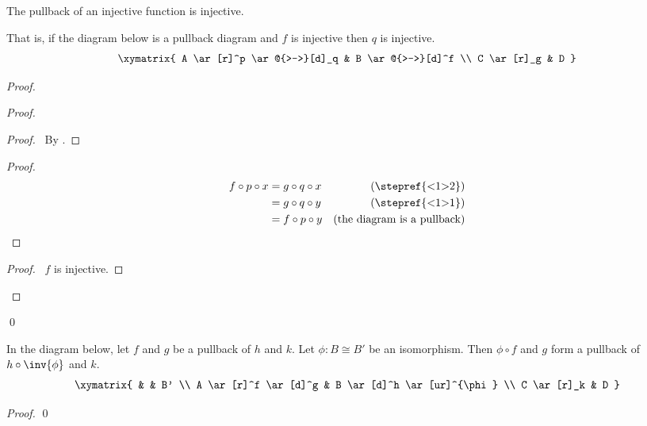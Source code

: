 \begin{prop}
  \label{prop:sets:pullback:injective}
 The pullback of an injective function is injective.

 That is, if the diagram below is a pullback diagram and $f$ is injective
then $q$ is injective.
\[      \xymatrix{ A \ar[r]^p \ar@{>->}[d]_q & B \ar@{>->}[d]^f \\
     C \ar[r]_g & D } \]
\end{prop}

\begin{proof}
 \pf
 \begin{proof}
   \begin{proof}
     \pf\ By .
   \end{proof}
   \begin{proof}
     \pf
     \begin{align*}
       f \circ p \circ x & = g \circ q \circ x & (\text{\stepref{<1>2}}) \\
       & = g \circ q \circ y & (\text{\stepref{<1>1}}) \\
       & = f \circ p \circ y & (\text{the diagram is a pullback})
     \end{align*}
   \end{proof}
   \begin{proof}
     \pf\ $f$ is injective.
   \end{proof}
 \end{proof}
 \qed
\end{proof}

\begin{prop}
  \label{prop:sets:pullback:iso}
  In the diagram below, let $f$ and $g$ be a pullback of $h$ and $k$. Let $\phi : B \cong B'$ be an isomorphism.
  Then $\phi \circ f$ and $g$ form a pullback of $h \circ \inv{\phi}$ and $k$.
  \[ \xymatrix{
  & & B' \\
  A \ar[r]^f \ar[d]^g & B \ar[d]^h \ar[ur]^{\phi} \\
  C \ar[r]_k & D
  } \]
\end{prop}

\begin{proof}
  \pf
  \qed
\end{proof}


